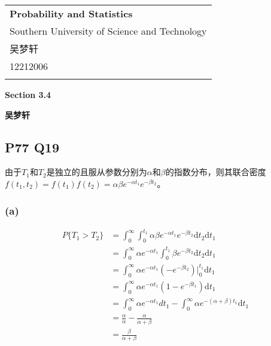 \documentclass[a4paper,12pt]{ctexart}
\begin{document}
\thispagestyle{empty} %

\begin{tabular}{p{15.5cm}}
{\large \bf Probability and Statistics} \\
Southern University of Science and Technology \\ 吴梦轩 \\ 12212006 \\
\hline
\\
\end{tabular}

\vspace*{0.3cm} %

\begin{center}
	{\Large \bf Section 3.4}
	\vspace{2mm}

	{\bf 吴梦轩}
		
\end{center}  

\vspace{0.4cm}

\subsection*{P77 Q19}

由于$T_1$和$T_2$是独立的且服从参数分别为$\alpha$和$\beta$的指数分布，则其联合密度$f(t_1,t_2) = f(t_1)f(t_2) = \alpha\beta e^{-\alpha t_1}e^{-\beta t_2}$。

\subsubsection*{(a)}

\begin{align*}
	P\{T_1 > T_2\} &= \int_{0}^{\infty}\int_{0}^{t_1}\alpha\beta e^{-\alpha t_1}e^{-\beta t_2} \mathrm{d}t_2 \mathrm{d}t_1 \\
	&= \int_{0}^{\infty}\alpha e^{-\alpha t_1}\int_{0}^{t_1}\beta e^{-\beta t_2} \mathrm{d}t_2 \mathrm{d}t_1 \\
	&= \int_{0}^{\infty}\alpha e^{-\alpha t_1}(-e^{-\beta t_2})\Big|_{0}^{t_1} \mathrm{d}t_1 \\
	&= \int_{0}^{\infty}\alpha e^{-\alpha t_1}(1-e^{-\beta t_1}) \mathrm{d}t_1 \\
	&= \int_{0}^{\infty}\alpha e^{-\alpha t_1}dt_1 - \int_{0}^{\infty}\alpha e^{-(\alpha+\beta) t_1} \mathrm{d}t_1 \\
	&= \frac{\alpha}{\alpha} - \frac{\alpha}{\alpha+\beta} \\
	&= \frac{\beta}{\alpha+\beta}
\end{align*}
\end{document}

